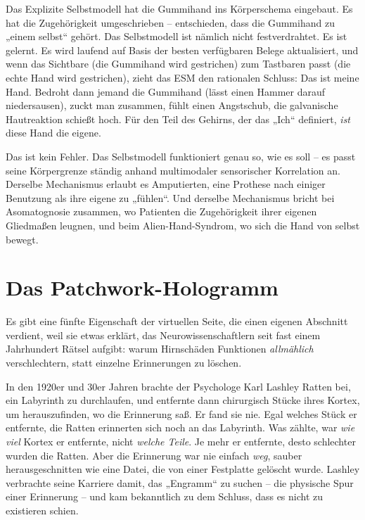 \documentclass[11pt, twoside, openright]{book}
\begin{document}
Das Explizite Selbstmodell hat die Gummihand ins Körperschema eingebaut. Es hat die Zugehörigkeit umgeschrieben -- entschieden, dass die Gummihand zu „einem selbst“ gehört. Das Selbstmodell ist nämlich nicht festverdrahtet. Es ist gelernt. Es wird laufend auf Basis der besten verfügbaren Belege aktualisiert, und wenn das Sichtbare (die Gummihand wird gestrichen) zum Tastbaren passt (die echte Hand wird gestrichen), zieht das ESM den rationalen Schluss: Das ist meine Hand. Bedroht dann jemand die Gummihand (lässt einen Hammer darauf niedersausen), zuckt man zusammen, fühlt einen Angstschub, die galvanische Hautreaktion schießt hoch. Für den Teil des Gehirns, der das „Ich“ definiert, \textit{ist} diese Hand die eigene.

Das ist kein Fehler. Das Selbstmodell funktioniert genau so, wie es soll -- es passt seine Körpergrenze ständig anhand multimodaler sensorischer Korrelation an. Derselbe Mechanismus erlaubt es Amputierten, eine Prothese nach einiger Benutzung als ihre eigene zu „fühlen“. Und derselbe Mechanismus bricht bei Asomatognosie zusammen, wo Patienten die Zugehörigkeit ihrer eigenen Gliedmaßen leugnen, und beim Alien-Hand-Syndrom, wo sich die Hand von selbst bewegt.

\section*{Das Patchwork-Hologramm}

Es gibt eine fünfte Eigenschaft der virtuellen Seite, die einen eigenen Abschnitt verdient, weil sie etwas erklärt, das Neurowissenschaftlern seit fast einem Jahrhundert Rätsel aufgibt: warum Hirnschäden Funktionen \textit{allmählich} verschlechtern, statt einzelne Erinnerungen zu löschen.

In den 1920er und 30er Jahren brachte der Psychologe Karl Lashley Ratten bei, ein Labyrinth zu durchlaufen, und entfernte dann chirurgisch Stücke ihres Kortex, um herauszufinden, wo die Erinnerung saß. Er fand sie nie. Egal welches Stück er entfernte, die Ratten erinnerten sich noch an das Labyrinth. Was zählte, war \textit{wie viel} Kortex er entfernte, nicht \textit{welche Teile}. Je mehr er entfernte, desto schlechter wurden die Ratten. Aber die Erinnerung war nie einfach \textit{weg}, sauber herausgeschnitten wie eine Datei, die von einer Festplatte gelöscht wurde. Lashley verbrachte seine Karriere damit, das „Engramm“ zu suchen -- die physische Spur einer Erinnerung -- und kam bekanntlich zu dem Schluss, dass es nicht zu existieren schien.
\end{document}
